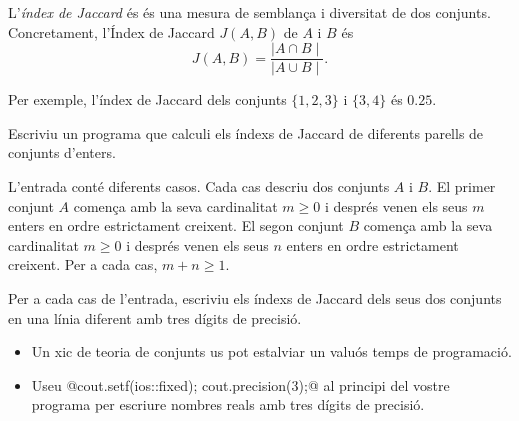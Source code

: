 

\Statement

L'\emph{índex de Jaccard} és
és una mesura de semblança i diversitat de dos conjunts.
Concretament, l'Índex de Jaccard $J(A,B)$ de $A$ i $B$
és \[ J(A,B) = \frac{\mid A\cap B\mid }{\mid A\cup B\mid }. \]

Per exemple, l'índex de Jaccard dels conjunts
$\{1,2,3\}$ i $\{3,4\}$ és $0.25$.

\medskip

Escriviu un programa que calculi els índexs de Jaccard de diferents
parells de conjunts d'enters.

\Input

L'entrada conté diferents casos.
Cada cas descriu dos conjunts $A$ i $B$.
El primer conjunt $A$ comença amb la seva cardinalitat $m \geq 0$
i després venen els seus $m$ enters en ordre estrictament creixent.
El segon conjunt $B$ comença amb la seva cardinalitat $m \geq 0$
i després venen els seus $n$ enters en ordre estrictament creixent.
Per a cada cas, $m+n\ge1$.

\Output

Per a cada cas de l'entrada, escriviu els índexs de Jaccard dels
seus dos conjunts en una línia diferent amb tres dígits de precisió.

\Hint

\begin{itemize}

\item Un xic de teoria de conjunts us pot estalviar un valuós
temps de programació.

\item Useu @cout.setf(ios::fixed); cout.precision(3);@ al principi del
vostre programa per escriure nombres reals amb tres dígits de precisió.

\end{itemize}
\smallskip

\Sample

